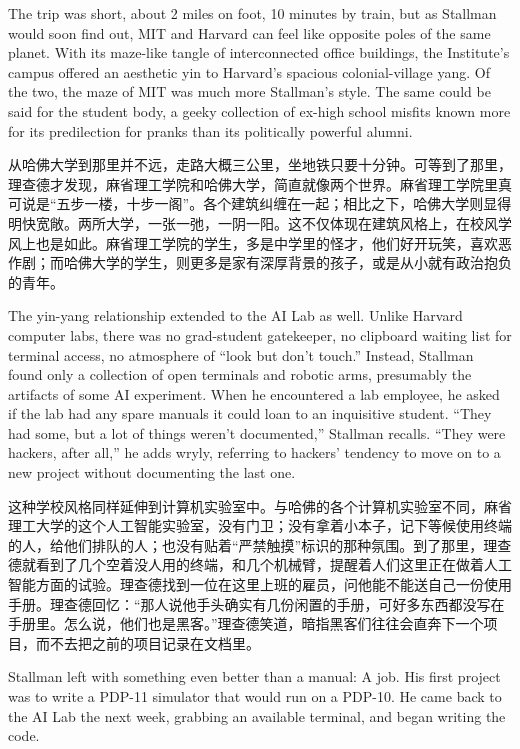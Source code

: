 \ifdefined\eng
The trip was short, about 2 miles on foot, 10 minutes by train, but as Stallman would soon find out, MIT and Harvard can feel like opposite poles of the same planet. With its maze-like tangle of interconnected office buildings, the Institute's campus offered an aesthetic yin to Harvard's spacious colonial-village yang.  Of the two, the maze of MIT was much more Stallman's style. The same could be said for the student body, a geeky collection of ex-high school misfits known more for its predilection for pranks than its politically powerful alumni.
\fi

\ifdefined\chs
从哈佛大学到那里并不远，走路大概三公里，坐地铁只要十分钟。可等到了那里，理查德才发现，麻省理工学院和哈佛大学，简直就像两个世界。麻省理工学院里真可说是``五步一楼，十步一阁''。各个建筑纠缠在一起；相比之下，哈佛大学则显得明快宽敞。两所大学，一张一弛，一阴一阳。这不仅体现在建筑风格上，在校风学风上也是如此。麻省理工学院的学生，多是中学里的怪才，他们好开玩笑，喜欢恶作剧；而哈佛大学的学生，则更多是家有深厚背景的孩子，或是从小就有政治抱负的青年。
\fi

\ifdefined\eng
The yin-yang relationship extended to the AI Lab as well. Unlike Harvard computer labs, there was no grad-student gatekeeper, no clipboard waiting list for terminal access, no atmosphere of ``look but don't touch.'' Instead, Stallman found only a collection of open terminals and robotic arms, presumably the artifacts of some AI experiment. When he encountered a lab employee, he asked if the lab had any spare manuals it could loan to an inquisitive student. ``They had some, but a lot of things weren't documented,'' Stallman recalls. ``They were hackers, after all,'' he adds wryly, referring to hackers' tendency to move on to a new project without documenting the last one.
\fi

\ifdefined\chs
这种学校风格同样延伸到计算机实验室中。与哈佛的各个计算机实验室不同，麻省理工大学的这个人工智能实验室，没有门卫；没有拿着小本子，记下等候使用终端的人，给他们排队的人；也没有贴着``严禁触摸''标识的那种氛围。到了那里，理查德就看到了几个空着没人用的终端，和几个机械臂，提醒着人们这里正在做着人工智能方面的试验。理查德找到一位在这里上班的雇员，问他能不能送自己一份使用手册。理查德回忆：``那人说他手头确实有几份闲置的手册，可好多东西都没写在手册里。怎么说，他们也是黑客。''理查德笑道，暗指黑客们往往会直奔下一个项目，而不去把之前的项目记录在文档里。
\fi

\ifdefined\eng
Stallman left with something even better than a manual: A job.  His first project was to write a PDP-11 simulator that would run on a PDP-10. He came back to the AI Lab the next week, grabbing an available terminal, and began writing the code.
\fi

